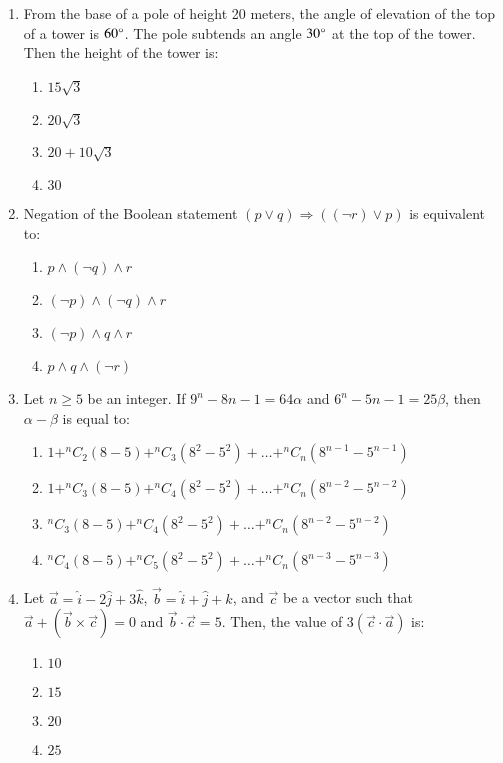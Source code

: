 \documentclass[journal,12pt,onecolumn]{IEEEtran}
\theoremstyle{remark}
\begin{document}
\begin{enumerate}
\item From the base of a pole of height 20 meters, the angle of elevation of the top of a tower is $60\degree$. The pole subtends an angle $30\degree$ at the top of the tower. Then the height of the tower is:
\begin{enumerate}
    \item $15\sqrt{3}$
    \item $20\sqrt{3}$
    \item $20 + 10\sqrt{3}$
    \item $30$
\end{enumerate}
\item Negation of the Boolean statement $(p \lor q) \Rightarrow ((\neg r) \lor p)$ is equivalent to:
\begin{enumerate}
    \item $p \land (\neg q) \land r$
    \item $(\neg p) \land (\neg q) \land r$
    \item $(\neg p) \land q \land r$
    \item $p \land q \land (\neg r)$
\end{enumerate}
\item Let \( n \geq 5 \) be an integer. If \( 9^n - 8n - 1 = 64 \alpha \) and \( 6^n - 5n - 1 = 25 \beta \), then \(\alpha - \beta\) is equal to:
\begin{enumerate}
    \item \( 1 + ^{n}C_2 (8 - 5) + ^{n}C_3 (8^2 - 5^2) + \ldots + ^{n}C_n (8^{n-1} - 5^{n-1}) \)
    \item \( 1 + ^{n}C_3 (8 - 5) + ^{n}C_4 (8^2 - 5^2) + \ldots + ^{n}C_n(8^{n-2} - 5^{n-2}) \)
    \item \( ^{n}C_3 (8 - 5) + ^{n}C_4 (8^2 - 5^2) + \ldots + ^{n}C_n(8^{n-2} - 5^{n-2}) \)
    \item \( ^{n}C_4 (8 - 5) + ^{n}C_5 (8^2 - 5^2) + \ldots + ^{n}C_n (8^{n-3} - 5^{n-3}) \)
\end{enumerate}
\item Let $\vec{a} = \hat{i} - 2\hat{j} + 3\hat{k}$, $\vec{b} = \hat{i} + \hat{j} + \hat{k}$, and $\vec{c}$ be a vector such that 
$\vec{a} + \left( \vec{b} \times \vec{c} \right) = 0$ and $\vec{b} \cdot \vec{c} = 5$. Then, the value of $3 \left( \vec{c} \cdot \vec{a} \right)$ is:
\begin{enumerate}
    \item $10$
    \item $15$
    \item $20$
    \item $25$

\end{enumerate}
\end{enumerate}
\end{document}
